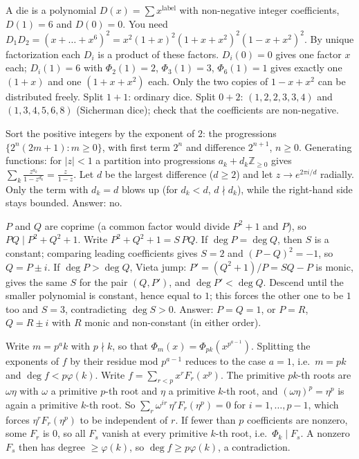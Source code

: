 \documentclass[11pt,a4paper]{article}
\begin{document}
 A die is a polynomial $D(x)=\sum x^{\text{label}}$ with non-negative integer coefficients, $D(1)=6$ and $D(0)=0$. You need $D_1D_2=(x+\dots+x^6)^2=x^2(1+x)^2(1+x+x^2)^2(1-x+x^2)^2$.
 By unique factorization each $D_i$ is a product of these factors. $D_i(0)=0$ gives one factor $x$ each; $D_i(1)=6$ with $\Phi_2(1)=2$, $\Phi_3(1)=3$, $\Phi_6(1)=1$ gives exactly one $(1+x)$ and one $(1+x+x^2)$ each. Only the two copies of $1-x+x^2$ can be distributed freely.
 Split $1+1$: ordinary dice. Split $0+2$: $(1,2,2,3,3,4)$ and $(1,3,4,5,6,8)$ (Sicherman dice); check that the coefficients are non-negative.

 Sort the positive integers by the exponent of $2$: the progressions $\{2^n(2m+1):m\ge0\}$, with first term $2^n$ and difference $2^{n+1}$, $n\ge0$.
 Generating functions: for $|z|<1$ a partition into progressions $a_k+d_k\mathbb{Z}_{\ge0}$ gives $\sum_k\frac{z^{a_k}}{1-z^{d_k}}=\frac z{1-z}$.
 Let $d$ be the largest difference ($d\ge2$) and let $z\to e^{2\pi i/d}$ radially. Only the term with $d_k=d$ blows up (for $d_k<d$, $d\nmid d_k$), while the right-hand side stays bounded. Answer: no.

 $P$ and $Q$ are coprime (a common factor would divide $P^2+1$ and $P$), so $PQ\mid P^2+Q^2+1$. Write $P^2+Q^2+1=S\,PQ$.
 If $\deg P=\deg Q$, then $S$ is a constant; comparing leading coefficients gives $S=2$ and $(P-Q)^2=-1$, so $Q=P\pm i$.
 If $\deg P>\deg Q$, Vieta jump: $P'=(Q^2+1)/P=SQ-P$ is monic, gives the same $S$ for the pair $(Q,P')$, and $\deg P'<\deg Q$. Descend until the smaller polynomial is constant, hence equal to $1$; this forces the other one to be $1$ too and $S=3$, contradicting $\deg S>0$. Answer: $P=Q=1$, or $P=R$, $Q=R\pm i$ with $R$ monic and non-constant (in either order).

 Write $m=p^ak$ with $p\nmid k$, so that $\Phi_m(x)=\Phi_{pk}(x^{p^{a-1}})$. Splitting the exponents of $f$ by their residue mod $p^{a-1}$ reduces to the case $a=1$, i.e.\ $m=pk$ and $\deg f<p\varphi(k)$.
 Write $f=\sum_{r<p}x^rF_r(x^p)$. The primitive $pk$-th roots are $\omega\eta$ with $\omega$ a primitive $p$-th root and $\eta$ a primitive $k$-th root, and $(\omega\eta)^p=\eta^p$ is again a primitive $k$-th root. So $\sum_r\omega^{ir}\,\eta^rF_r(\eta^p)=0$ for $i=1,\dots,p-1$, which forces $\eta^rF_r(\eta^p)$ to be independent of $r$.
 If fewer than $p$ coefficients are nonzero, some $F_r$ is $0$, so all $F_s$ vanish at every primitive $k$-th root, i.e.\ $\Phi_k\mid F_s$. A nonzero $F_s$ then has degree $\ge\varphi(k)$, so $\deg f\ge p\varphi(k)$, a contradiction.
\end{document}
